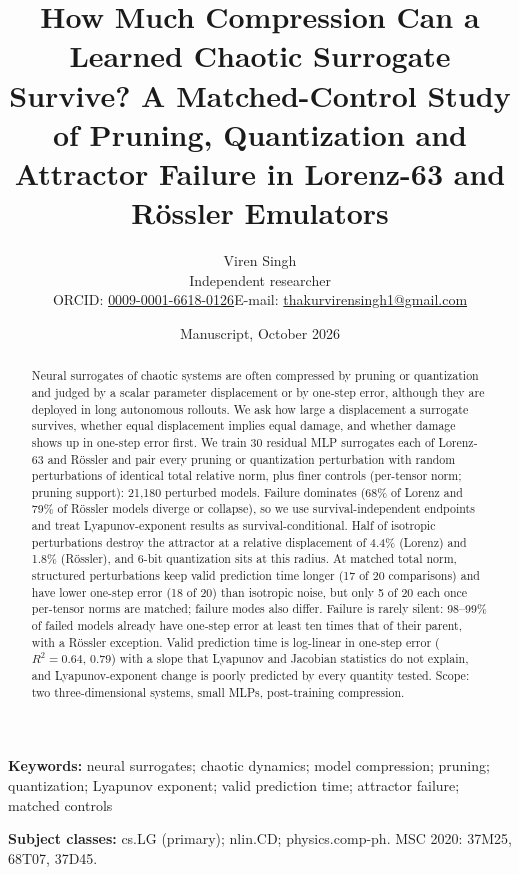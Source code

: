 \documentclass[11pt]{article}
\title{\textbf{How Much Compression Can a Learned Chaotic Surrogate Survive? A Matched-Control Study of Pruning, Quantization and Attractor Failure in Lorenz-63 and R\"ossler Emulators}}
\author{Viren Singh\\[2pt]\small Independent researcher\\[1pt]\small ORCID: \href{https://orcid.org/0009-0001-6618-0126}{0009-0001-6618-0126}\quad E-mail: \href{mailto:thakurvirensingh1@gmail.com}{thakurvirensingh1@gmail.com}}
\date{Manuscript, October 2026}
\begin{document}
\maketitle

\begin{abstract}
\noindent Neural surrogates of chaotic systems are often compressed by pruning or quantization and judged by a scalar parameter displacement or by one-step error, although they are deployed in long autonomous rollouts. We ask how large a displacement a surrogate survives, whether equal displacement implies equal damage, and whether damage shows up in one-step error first. We train 30 residual MLP surrogates each of Lorenz-63 and R\"ossler and pair every pruning or quantization perturbation with random perturbations of identical total relative norm, plus finer controls (per-tensor norm; pruning support): 21{,}180 perturbed models. Failure dominates (68\% of Lorenz and 79\% of R\"ossler models diverge or collapse), so we use survival-independent endpoints and treat Lyapunov-exponent results as survival-conditional. Half of isotropic perturbations destroy the attractor at a relative displacement of 4.4\% (Lorenz) and 1.8\% (R\"ossler), and 6-bit quantization sits at this radius. At matched total norm, structured perturbations keep valid prediction time longer (17 of 20 comparisons) and have lower one-step error (18 of 20) than isotropic noise, but only 5 of 20 each once per-tensor norms are matched; failure modes also differ. Failure is rarely silent: 98--99\% of failed models already have one-step error at least ten times that of their parent, with a R\"ossler exception. Valid prediction time is log-linear in one-step error ($R^2=0.64$, $0.79$) with a slope that Lyapunov and Jacobian statistics do not explain, and Lyapunov-exponent change is poorly predicted by every quantity tested. Scope: two three-dimensional systems, small MLPs, post-training compression.
\end{abstract}

\noindent\textbf{Keywords:} neural surrogates; chaotic dynamics; model compression; pruning; quantization; Lyapunov exponent; valid prediction time; attractor failure; matched controls

\noindent\textbf{Subject classes:} cs.LG (primary); nlin.CD; physics.comp-ph. MSC 2020: 37M25, 68T07, 37D45.

\medskip
\noindent{}
\end{document}
